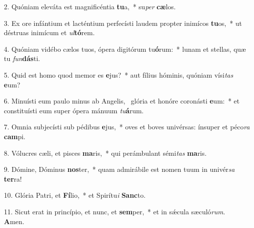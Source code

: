 2. Quóniam eleváta est magnificéntia \textbf{tu}a,~*  su\textit{per} \textbf{cæ}los.\

3. Ex ore infántium et lacténtium perfecísti laudem propter inimícos \textbf{tu}os,~*  ut déstruas inimícum et \textit{ul}\textbf{tó}rem.\

4. Quóniam vidébo cælos tuos, ópera digitórum tu\textbf{ó}rum:~*  lunam et stellas, quæ tu \textit{fun}\textbf{dás}ti.\

5. Quid est homo quod memor es \textbf{e}jus?~*  aut fílius hóminis, quóniam vísi\textit{tas} \textbf{e}um?\

6. Minuísti eum paulo minus ab Angelis, \dag\  glória et honóre coronásti \textbf{e}um:~*  et constituísti eum super ópera mánuum \textit{tu}\textbf{á}rum.\

7. Omnia subjecísti sub pédibus \textbf{e}jus,~*  oves et boves univérsas: ínsuper et péco\textit{ra} \textbf{cam}pi.\

8. Vólucres cæli, et pisces \textbf{ma}ris,~*  qui perámbulant sémi\textit{tas} \textbf{ma}ris.\

9. Dómine, Dóminus \textbf{nos}ter,~*  quam admirábile est nomen tuum in univér\textit{sa} \textbf{ter}ra!\

10. Glória Patri, et \textbf{Fí}lio,~*  et Spirítu\textit{i} \textbf{Sanc}to.\

11. Sicut erat in princípio, et nunc, et \textbf{sem}per,~*  et in sǽcula sæculó\textit{rum}. \textbf{A}men.\

